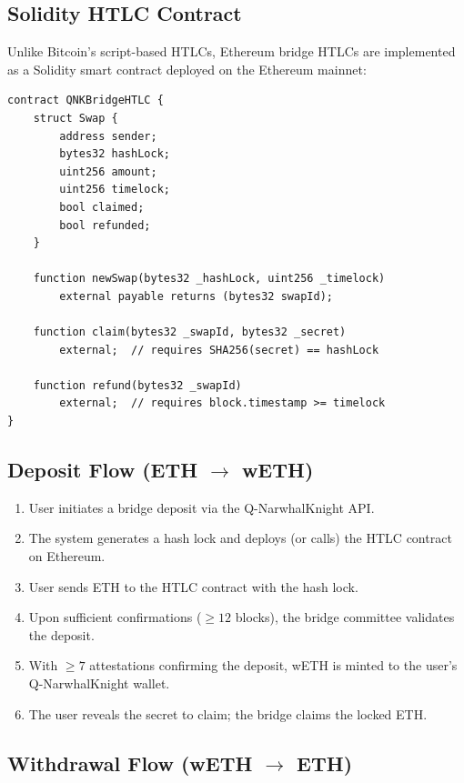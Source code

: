 \documentclass[11pt,a4paper]{article}
\begin{document}
\subsection{Solidity HTLC Contract}

Unlike Bitcoin's script-based HTLCs, Ethereum bridge HTLCs are implemented as a Solidity smart contract deployed on the Ethereum mainnet:

\begin{lstlisting}[language={},title={Ethereum HTLC Contract (Simplified)}]
contract QNKBridgeHTLC {
    struct Swap {
        address sender;
        bytes32 hashLock;
        uint256 amount;
        uint256 timelock;
        bool claimed;
        bool refunded;
    }

    function newSwap(bytes32 _hashLock, uint256 _timelock)
        external payable returns (bytes32 swapId);

    function claim(bytes32 _swapId, bytes32 _secret)
        external;  // requires SHA256(secret) == hashLock

    function refund(bytes32 _swapId)
        external;  // requires block.timestamp >= timelock
}
\end{lstlisting}

\subsection{Deposit Flow (ETH $\rightarrow$ wETH)}

\begin{enumerate}
    \item User initiates a bridge deposit via the Q-NarwhalKnight API.
    \item The system generates a hash lock and deploys (or calls) the HTLC contract on Ethereum.
    \item User sends ETH to the HTLC contract with the hash lock.
    \item Upon sufficient confirmations ($\geq 12$ blocks), the bridge committee validates the deposit.
    \item With $\geq 7$ attestations confirming the deposit, wETH is minted to the user's Q-NarwhalKnight wallet.
    \item The user reveals the secret to claim; the bridge claims the locked ETH.
\end{enumerate}

\subsection{Withdrawal Flow (wETH $\rightarrow$ ETH)}
\end{document}
